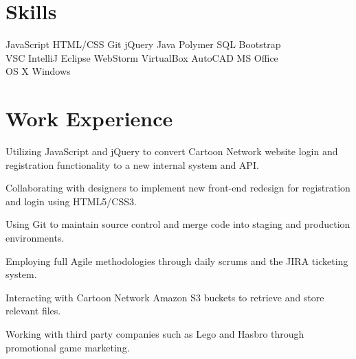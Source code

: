 \documentclass[]{deedy-resume-openfont}
\begin{document}
\begin{minipage}[t]{0.66\textwidth}


\section{Skills}
JavaScript \textbullet{} HTML/CSS \textbullet{} Git \textbullet{} jQuery \textbullet{} Java \textbullet{} Polymer \textbullet{} SQL \textbullet{} Bootstrap\\
VSC \textbullet{} IntelliJ \textbullet{} Eclipse \textbullet{} WebStorm \textbullet{} VirtualBox \textbullet{} AutoCAD \textbullet{} MS Office \\
OS X \textbullet{} Windows \\
\sectionsep


\section{Work Experience}
\vspace{\topsep} %
\begin{tightemize}
\item Utilizing JavaScript and jQuery to convert Cartoon Network website login and registration functionality to a new internal system and API.
\item Collaborating with designers to implement new front-end redesign for registration and login using HTML5/CSS3.
\item Using Git to maintain source control and merge code into staging and production environments.
\item Employing full Agile methodologies through daily scrums and the JIRA ticketing system.
\item Interacting with Cartoon Network Amazon S3 buckets to retrieve and store relevant files.
\item Working with third party companies such as Lego and Hasbro through promotional game marketing.
\end{tightemize}
\sectionsep


\end{minipage}
\end{document}
